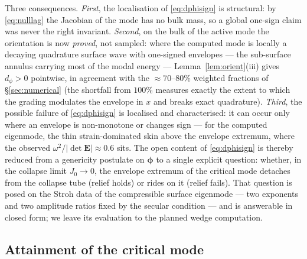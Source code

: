 \begin{remark}
    \label{rem:orient}
    Three consequences. \emph{First}, the localisation of \eqref{eq:dphisign} is structural: by \eqref{eq:nulllag}
    the Jacobian of the mode has no bulk mass, so a global one-sign claim was never the right invariant. \emph{Second},
    on the bulk of the active mode the orientation is now \emph{proved}, not sampled: where the computed mode is
    locally a decaying quadrature surface wave with one-signed envelopes --- the sub-surface annulus carrying most of
    the modal energy --- Lemma~\ref{lem:orient}(iii) gives $d_\phi>0$ pointwise, in agreement with the
    ${\approx}70$--$80\%$ weighted fractions of \S\ref{sec:numerical} (the shortfall from $100\%$ measures exactly the
    extent to which the grading modulates the envelope in $x$ and breaks exact quadrature). \emph{Third}, the possible
    failure of \eqref{eq:dphisign} is localised and characterised: it can occur only where an envelope is
    non-monotone or changes sign --- for the computed eigenmode, the thin strain-dominated skin above the envelope
    extremum, where the observed $\omega^2/|\det\bm E|\approx0.6$ sits. The open content of \eqref{eq:dphisign} is
    thereby reduced from a genericity postulate on $\bm\phi$ to a single explicit question: whether, in the collapse
    limit $J_0\to0$, the envelope extremum of the critical mode detaches from the collapse tube (relief holds) or
    rides on it (relief fails). That question is posed on the Stroh data of the compressible surface eigenmode ---
    two exponents and two amplitude ratios fixed by the secular condition --- and is answerable in closed form; we
    leave its evaluation to the planned wedge computation.
\end{remark}

\subsection{Attainment of the critical mode}
\label{sub:attain}

